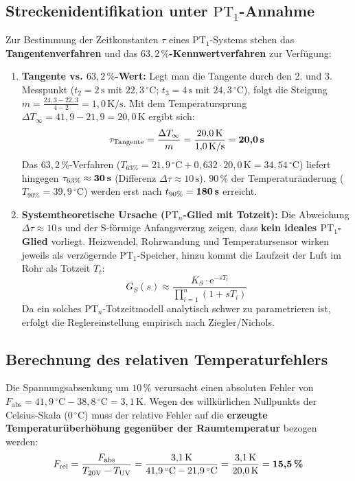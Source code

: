\documentclass[a4paper,10pt,department=FakEI]{OTHRartcl}
\begin{document}
\subsection{Streckenidentifikation unter \texorpdfstring{$\text{PT}_1$}{PT1}-Annahme}
Zur Bestimmung der Zeitkonstanten $\tau$ eines $\text{PT}_1$-Systems stehen das \textbf{Tangentenverfahren} und das \textbf{$63{,}2\,\%$-Kennwertverfahren} zur Verfügung:
\begin{enumerate}
    \item \textbf{Tangente vs. $63{,}2\,\%$-Wert:}
    Legt man die Tangente durch den 2. und 3. Messpunkt ($t_2 = 2\,\text{s}$ mit $22{,}3\,^\circ\text{C}$; $t_3 = 4\,\text{s}$ mit $24{,}3\,^\circ\text{C}$), folgt die Steigung $m = \frac{24{,}3 - 22{,}3}{4 - 2} = 1{,}0\,\text{K/s}$. Mit dem Temperatursprung $\Delta T_{\infty} = 41{,}9 - 21{,}9 = 20{,}0\,\text{K}$ ergibt sich:
    \begin{equation}
        \tau_{\text{Tangente}} = \frac{\Delta T_{\infty}}{m} = \frac{20{,}0\,\text{K}}{1{,}0\,\text{K/s}} = \textbf{20,0\,s}
    \end{equation}
    Das $63{,}2\,\%$-Verfahren ($T_{63\%} = 21{,}9\,^\circ\text{C} + 0{,}632 \cdot 20{,}0\,\text{K} = 34{,}54\,^\circ\text{C}$) liefert hingegen $\tau_{63\%} \approx \textbf{30\,s}$ (Differenz $\Delta\tau \approx 10\,\text{s}$). $90\,\%$ der Temperaturänderung ($T_{90\%} = 39{,}9\,^\circ\text{C}$) werden erst nach $t_{90\%} = \textbf{180\,s}$ erreicht.
    \item \textbf{Systemtheoretische Ursache ($\text{PT}_n$-Glied mit Totzeit):}
    Die Abweichung $\Delta\tau \approx 10\,\text{s}$ und der S-förmige Anfangsverzug zeigen, dass \textbf{kein ideales $\text{PT}_1$-Glied} vorliegt. Heizwendel, Rohrwandung und Temperatursensor wirken jeweils als verzögernde $\text{PT}_1$-Speicher, hinzu kommt die Laufzeit der Luft im Rohr als Totzeit $T_t$:
    \begin{equation}
        G_S(s) \approx \frac{K_S \cdot \mathrm{e}^{-s T_t}}{\prod_{i=1}^{n} (1 + s T_i)}
    \end{equation}
    Da ein solches $\text{PT}_n$-Totzeitmodell analytisch schwer zu parametrieren ist, erfolgt die Reglereinstellung empirisch nach Ziegler/Nichols.
\end{enumerate}

\subsection{Berechnung des relativen Temperaturfehlers}
Die Spannungsabsenkung um $10\,\%$ verursacht einen absoluten Fehler von $F_{\text{abs}} = 41{,}9\,^\circ\text{C} - 38{,}8\,^\circ\text{C} = 3{,}1\,\text{K}$. Wegen des willkürlichen Nullpunkts der Celsius-Skala ($0\,^\circ\text{C}$) muss der relative Fehler auf die \textbf{erzeugte Temperaturüberhöhung gegenüber der Raumtemperatur} bezogen werden:
\begin{equation}
    F_{\text{rel}} = \frac{F_{\text{abs}}}{T_{20\text{V}} - T_{\text{UV}}} = \frac{3{,}1\,\text{K}}{41{,}9\,^\circ\text{C} - 21{,}9\,^\circ\text{C}} = \frac{3{,}1\,\text{K}}{20{,}0\,\text{K}} = \textbf{15,5\,\%}
\end{equation}
\end{document}
